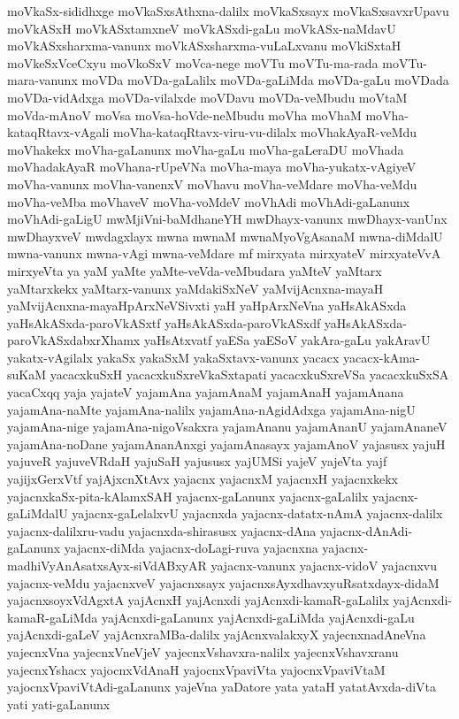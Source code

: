 {moVkaSx-sididhxge
moVkaSxsAthxna-dalilx
moVkaSxsayx
moVkaSxsavxrUpavu
moVkASxH
moVkASxtamxneV
moVkASxdi-gaLu
moVkASx-naMdavU
moVkASxsharxma-vanunx
moVkASxsharxma-vuLaLxvanu
moVkiSxtaH
moVkeSxVceCxyu
moVkoSxV
moVca-nege
moVTu
moVTu-ma-rada
moVTu-mara-vanunx
moVDa
moVDa-gaLalilx
moVDa-gaLiMda
moVDa-gaLu
moVDada
moVDa-vidAdxga
moVDa-vilalxde
moVDavu
moVDa-veMbudu
moVtaM
moVda-mAnoV
moVsa
moVsa-hoVde-neMbudu
moVha
moVhaM
moVha-kataqRtavx-vAgali
moVha-kataqRtavx-viru-vu-dilalx
moVhakAyaR-veMdu
moVhakekx
moVha-gaLanunx
moVha-gaLu
moVha-gaLeraDU
moVhada
moVhadakAyaR
moVhana-rUpeVNa
moVha-maya
moVha-yukatx-vAgiyeV
moVha-vanunx
moVha-vanenxV
moVhavu
moVha-veMdare
moVha-veMdu
moVha-veMba
moVhaveV
moVha-voMdeV
moVhAdi
moVhAdi-gaLanunx
moVhAdi-gaLigU
mwMjiVni-baMdhaneYH
mwDhayx-vanunx
mwDhayx-vanUnx
mwDhayxveV
mwdagxlayx
mwna
mwnaM
mwnaMyoVgAsanaM
mwna-diMdalU
mwna-vanunx
mwna-vAgi
mwna-veMdare
mf
mirxyata
mirxyateV
mirxyateVvA
mirxyeVta
ya
yaM
yaMte
yaMte-veVda-veMbudara
yaMteV
yaMtarx
yaMtarxkekx
yaMtarx-vanunx
yaMdakiSxNeV
yaMvijAcnxna-mayaH
yaMvijAcnxna-mayaHpArxNeVSivxti
yaH
yaHpArxNeVna
yaHsAkASxda
yaHsAkASxda-paroVkASxtf
yaHsAkASxda-paroVkASxdf
yaHsAkASxda-paroVkASxdabxrXhamx
yaHsAtxvatf
yaESa
yaESoV
yakAra-gaLu
yakAravU
yakatx-vAgilalx
yakaSx
yakaSxM
yakaSxtavx-vanunx
yacacx
yacacx-kAma-suKaM
yacacxkuSxH
yacacxkuSxreVkaSxtapati
yacacxkuSxreVSa
yacacxkuSxSA
yacaCxqq
yaja
yajateV
yajamAna
yajamAnaM
yajamAnaH
yajamAnana
yajamAna-naMte
yajamAna-nalilx
yajamAna-nAgidAdxga
yajamAna-nigU
yajamAna-nige
yajamAna-nigoVsakxra
yajamAnanu
yajamAnanU
yajamAnaneV
yajamAna-noDane
yajamAnanAnxgi
yajamAnasayx
yajamAnoV
yajasusx
yajuH
yajuveR
yajuveVRdaH
yajuSaH
yajususx
yajUMSi
yajeV
yajeVta
yajf
yajijxGerxVtf
yajAjxcnXtAvx
yajacnx
yajacnxM
yajacnxH
yajacnxkekx
yajacnxkaSx-pita-kAlamxSAH
yajacnx-gaLanunx
yajacnx-gaLalilx
yajacnx-gaLiMdalU
yajacnx-gaLelalxvU
yajacnxda
yajacnx-datatx-nAmA
yajacnx-dalilx
yajacnx-dalilxru-vadu
yajacnxda-shirasusx
yajacnx-dAna
yajacnx-dAnAdi-gaLanunx
yajacnx-diMda
yajacnx-doLagi-ruva
yajacnxna
yajacnx-madhiVyAnAsatxsAyx-siVdABxyAR
yajacnx-vanunx
yajacnx-vidoV
yajacnxvu
yajacnx-veMdu
yajacnxveV
yajacnxsayx
yajacnxsAyxdhavxyuRsatxdayx-didaM
yajacnxsoyxVdAgxtA
yajAcnxH
yajAcnxdi
yajAcnxdi-kamaR-gaLalilx
yajAcnxdi-kamaR-gaLiMda
yajAcnxdi-gaLanunx
yajAcnxdi-gaLiMda
yajAcnxdi-gaLu
yajAcnxdi-gaLeV
yajAcnxraMBa-dalilx
yajAcnxvalakxyX
yajecnxnadAneVna
yajecnxVna
yajecnxVneVjeV
yajecnxVshavxra-nalilx
yajecnxVshavxranu
yajecnxYshacx
yajocnxVdAnaH
yajocnxVpaviVta
yajocnxVpaviVtaM
yajocnxVpaviVtAdi-gaLanunx
yajeVna
yaDatore
yata
yataH
yatatAvxda-diVta
yati
yati-gaLanunx
}

